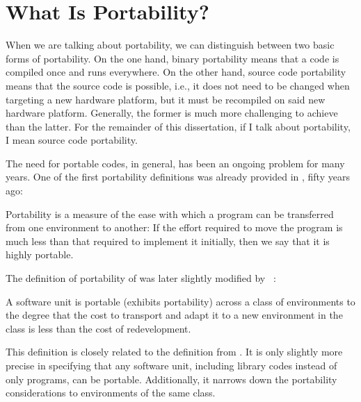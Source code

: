 \section{What Is Portability?}
\label{sec::portability}

When we are talking about portability, we can distinguish between two basic forms of portability. 
On the one hand, binary portability means that a code is compiled once and runs everywhere. 
On the other hand, source code portability means that the source code is possible, i.e., it does not need to be changed when targeting a new hardware platform, but it must be recompiled on said new hardware platform. 
Generally, the former is much more challenging to achieve than the latter. 
For the remainder of this dissertation, if I talk about portability, I mean source code portability. 

The need for portable codes, in general, has been an ongoing problem for many years. 
One of the first portability definitions was already provided in \citeyear{poole_portability_1975}, fifty years ago: 
\begin{quotebox}{\citet{poole_portability_1975}}
    Portability is a measure of the ease with which a program can be transferred from one environment to another: If the effort required to move the program is much less than that required to implement it initially, then we say that it is highly portable.
\end{quotebox}
The definition of portability of \citet{poole_portability_1975} was later slightly modified by \citeauthor{mooney_strategies_1990}~\cite{mooney_strategies_1990, mooney_bringing_1997}:
\begin{quotebox}{\citet{mooney_bringing_1997}}
    A software unit is portable (exhibits portability) across a class of environments to the degree that the cost to transport and adapt it to a new environment in the class is less than the cost of redevelopment. 
\end{quotebox}
This definition is closely related to the definition from \citet{poole_portability_1975}. 
It is only slightly more precise in specifying that any software unit, including library codes instead of only programs, can be portable. 
Additionally, it narrows down the portability considerations to environments of the same class.  

